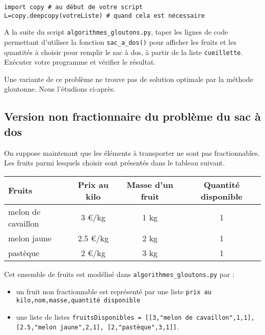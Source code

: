 \begin{lstlisting}
import copy # au début de votre script
L=copy.deepcopy(votreListe) # quand cela est nécessaire
\end{lstlisting}

\begin{question}
A la suite du script \lstinline{algorithmes_gloutons.py}, taper les lignes de code permettant d’utiliser la fonction \lstinline{sac_a_dos()} pour afficher les  fruits et les quantités à choisir pour remplir le sac à dos, à partir de la liste \lstinline{cueillette}. Exécuter votre programme et vérifier le résultat.
\end{question}


\vspace*{0.5cm}
Une variante de ce problème ne trouve pas de solution optimale par la méthode gloutonne. Nous l'étudions ci-après.

\subsection*{Version non fractionnaire du problème du sac à dos}
\label{sec:VersionNonFractionnaireDuProblèmeDuSacÀDos}

On suppose maintenant que les éléments à transporter ne sont pas fractionnables. Les fruits parmi lesquels choisir sont présentés dans le tableau suivant.


\begin{table}[h]
	\centering
		\begin{tabular}{|l|c|c|c|}
\hline
Fruits  & Prix au kilo & Masse d’un fruit & Quantité disponible\\
\hline
melon de cavaillon & 3 €/kg & 1 kg & 1\\
melon jaune  & 2.5 €/kg & 2 kg & 1\\
pastèque & 2 €/kg & 3 kg & 1 \\

\hline
		\end{tabular}
	\label{tab_fruit2}
\end{table}

Cet ensemble de fruits est modélisé dans \lstinline{algorithmes_gloutons.py} par :
\begin{itemize}
\item un fruit non fractionnable est représenté par une liste \lstinline{prix au kilo,nom,masse,quantité disponible}
\item une liste de listes \lstinline{fruitsDisponibles = [[3,"melon de cavaillon",1,1], [2.5,"melon jaune",2,1], [2,"pastèque",3,1]]}.
\end{itemize}



